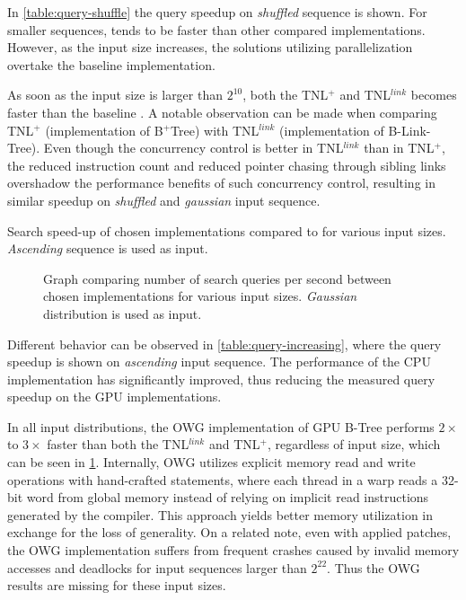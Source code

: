 In \cref{table:query-shuffle} the query speedup on \textit{shuffled} sequence is shown. For smaller sequences,  tends to be faster than other compared implementations. However, as the input size increases, the solutions utilizing parallelization overtake the baseline implementation.

As soon as the input size is larger than $2^{10}$, both the TNL$^+$ and TNL$^{link}$ becomes faster than the baseline . A notable observation can be made when comparing TNL$^+$ (implementation of B$^+$Tree) with TNL$^{link}$ (implementation of B-Link-Tree). Even though the concurrency control is better in TNL$^{link}$ than in TNL$^+$, the reduced instruction count and reduced pointer chasing through sibling links overshadow the performance benefits of such concurrency control, resulting in similar speedup on \textit{shuffled} and \textit{gaussian} input sequence.

\begin{table}
  \centering
  
  \caption[Search speed-up compared to , ascending sequence.]{Search speed-up of chosen implementations compared to  for various input sizes. \textit{Ascending} sequence is used as input.}
  \label{table:query-increasing}
\end{table}

\begin{figure}
  
  \caption[Search comparison with gaussian distribution as input.]{Graph comparing number of search queries per second between chosen implementations for various input sizes. \textit{Gaussian} distribution is used as input.}
  \label{figure:query-gaussian}
\end{figure}

Different behavior can be observed in \cref{table:query-increasing}, where the query speedup is shown on \textit{ascending} input sequence. The performance of the CPU implementation has significantly improved, thus reducing the measured query speedup on the GPU implementations.

In all input distributions, the OWG implementation of GPU B-Tree performs $2\times$ to $3\times$ faster than both the TNL$^{link}$ and TNL$^+$, regardless of input size, which can be seen in \cref{figure:query-gaussian}. Internally, OWG utilizes explicit memory read and write operations with hand-crafted  statements, where each thread in a warp reads a 32-bit word from global memory instead of relying on implicit read instructions generated by the compiler. This approach yields better memory utilization in exchange for the loss of generality. On a related note, even with applied patches, the OWG implementation suffers from frequent crashes caused by invalid memory accesses and deadlocks for input sequences larger than $2^{22}$. Thus the OWG results are missing for these input sizes.

